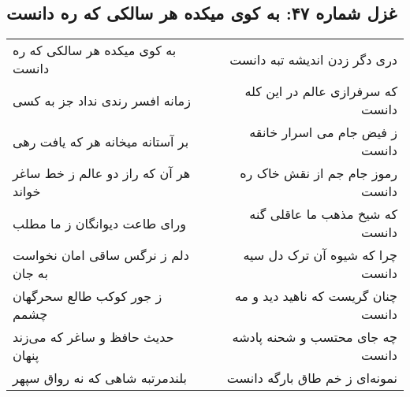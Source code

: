 \begin{center}
\section*{غزل شماره ۴۷: به کوی میکده هر سالکی که ره دانست}
\label{sec:sh047}
\begin{longtable}{l p{0.5cm} r}
به کوی میکده هر سالکی که ره دانست
&&
دری دگر زدن اندیشه تبه دانست
\\
زمانه افسر رندی نداد جز به کسی
&&
که سرفرازی عالم در این کله دانست
\\
بر آستانه میخانه هر که یافت رهی
&&
ز فیض جام می اسرار خانقه دانست
\\
هر آن که راز دو عالم ز خط ساغر خواند
&&
رموز جام جم از نقش خاک ره دانست
\\
ورای طاعت دیوانگان ز ما مطلب
&&
که شیخ مذهب ما عاقلی گنه دانست
\\
دلم ز نرگس ساقی امان نخواست به جان
&&
چرا که شیوه آن ترک دل سیه دانست
\\
ز جور کوکب طالع سحرگهان چشمم
&&
چنان گریست که ناهید دید و مه دانست
\\
حدیث حافظ و ساغر که می‌زند پنهان
&&
چه جای محتسب و شحنه پادشه دانست
\\
بلندمرتبه شاهی که نه رواق سپهر
&&
نمونه‌ای ز خم طاق بارگه دانست
\\
\end{longtable}
\end{center}
